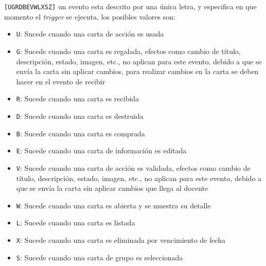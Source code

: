 \begin{definition}
	{\Large\color{blue} \verb/[UGRDBEVWLXSZ]/}
	un evento esta descrito por una única letra, y especifica en que momento el \textit{trigger} se 
	ejecuta, los posibles valores son:

	\begin{itemize}
		\item {\Large\color{blue} \verb/U/}: Sucede cuando una carta de acción es usada
		\item {\Large\color{blue} \verb/G/}: Sucede cuando una carta es regalada, efectos como cambio 
			de título, descripción, estado, imagen, etc., no aplican para este evento, debido a 
			que se envía la carta sin aplicar cambios, para realizar cambios en la carta se deben 
			hacer en el evento de recibir
		\item {\Large\color{blue} \verb/R/}: Sucede cuando una carta es recibida
		\item {\Large\color{blue} \verb/D/}: Sucede cuando una carta es destruida
		\item {\Large\color{blue} \verb/B/}: Sucede cuando una carta es comprada
		\item {\Large\color{blue} \verb/E/}: Sucede cuando una carta de información es editada
		\item {\Large\color{blue} \verb/V/}: Sucede cuando una carta de acción es validada, efectos 
			como cambio de título, descripción, estado, imagen, etc., no aplican para este evento, 
			debido a que se envía la carta sin aplicar cambios que llega al docente
		\item {\Large\color{blue} \verb/W/}: Sucede cuando una carta es abierta y se muestra su detalle
		\item {\Large\color{blue} \verb/L/}: Sucede cuando una carta es listada
		\item {\Large\color{blue} \verb/X/}: Sucede cuando una carta es eliminada por vencimiento de fecha
		\item {\Large\color{blue} \verb/S/}: Sucede cuando una carta de grupo es seleccionada
	\end{itemize}
\end{definition}

